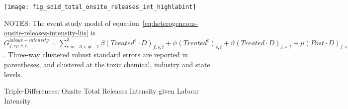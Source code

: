 \begin{figure}[H]
    \centering
    \texttt{[image: fig\_sdid\_total\_onsite\_releases\_int\_highlabint]}
    \caption{Triple-Differences: Onsite Total Releases Intensity given Labour Intensity}
    \label{fig:heterogeneous-onsite-releases-intensity-liis}
    \begin{minipage}{18cm}
        \vspace{0.05in}
        NOTES: The event study model of equation~\ref{eq:heterogeneous-onsite-releases-intensity-liis} is $G_{f,cp,c,t}^{labour-intensity} = \sum_{{e = -3},{e \neq -1}}^{3} \beta (Treated^{e} \cdot D)_{f,s,t} + \psi (Treated^{e})_{s,t} + \vartheta (Treated \cdot D)_{f,s,t} + \mu (Post \cdot D)_{f,s,t} + \tau Treated_{s,t} + \rho D_{f,s,t} + \alpha Post_{t} + \delta X_{v,c,t-1} + \omega F_{f,t} + \lambda_{t} + \gamma_{f} + \phi_{cp} + \zeta_{c} + \eta_{c,t} + \varepsilon_{f,cp,c,t}$. Three-way clustered robust standard errors are reported in parentheses, and clustered at the toxic chemical, industry and state levels.
    \end{minipage}
\end{figure}